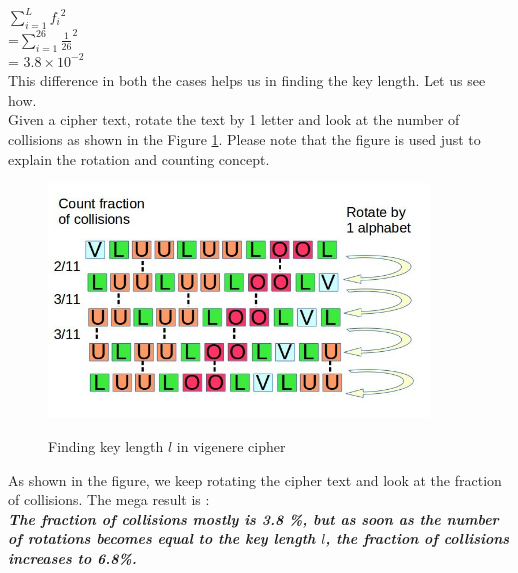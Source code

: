 \documentclass[a4paper]{article}
\begin{document}
$\sum_{i=1}^L {f_i}^2$\\

=$\sum_{i=1}^{26} {\frac{1}{26}}^2$\\

= $3.8 \times {10}^{-2}$  \\

This difference in both the cases helps us in finding the key length. Let us see how. \\

Given a cipher text, rotate the text by 1 letter and look at the number of collisions as shown in the Figure \ref{vigc}. Please note that the figure is used just to explain the rotation and counting concept. 

\begin{figure}[h]
\centering
\includegraphics[width=0.9\textwidth]{vig_c.jpg}
\label{vigc}
\caption{Finding key length $l$ in vigenere cipher}
\end{figure}

As shown in the figure, we keep rotating the cipher text and look at the fraction of collisions. The mega result is : \\

\textbf{\textit{The fraction of collisions mostly is 3.8 \%, but as soon as the number of rotations becomes equal to the key length $l$, the fraction of collisions increases to 6.8\%.}} 
\end{document}
